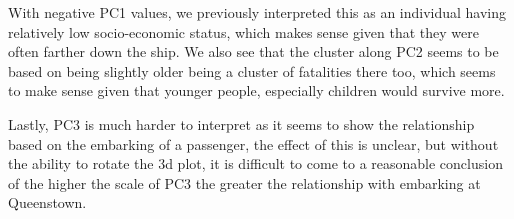 \documentclass[11pt]{article}
\begin{document}
With negative PC1 values, we previously interpreted this as an
individual having relatively low socio-economic status, which makes
sense given that they were often farther down the ship. We also see that
the cluster along PC2 seems to be based on being slightly older being a
cluster of fatalities there too, which seems to make sense given that
younger people, especially children would survive more.

Lastly, PC3 is much harder to interpret as it seems to show the
relationship based on the embarking of a passenger, the effect of this
is unclear, but without the ability to rotate the 3d plot, it is
difficult to come to a reasonable conclusion of the higher the scale of
PC3 the greater the relationship with embarking at Queenstown.


    
    
    
\end{document}
